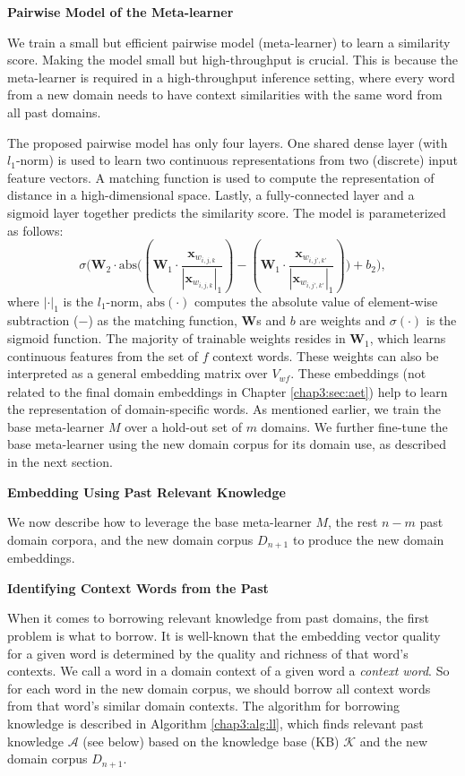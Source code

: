 \textbf{Pairwise Model of the Meta-learner}

We train a small but efficient pairwise model (meta-learner) to learn a similarity score. 
Making the model small but high-throughput is crucial.
This is because the meta-learner is required in a high-throughput inference setting, where every word from a new domain needs to have context similarities with the same word from all past domains. 

The proposed pairwise model has only four layers. 
One shared dense layer (with $l_1$-norm) is used to learn two continuous representations from two (discrete) input feature vectors.
A matching function is used to compute the representation of distance in a high-dimensional space.
Lastly, a fully-connected layer and a sigmoid layer together predicts the similarity score.
The model is parameterized as follows:
\begin{equation}
\sigma \big( \bm{W}_2 \cdot \text{abs}\big( ( \bm{W}_1 \cdot \frac{\mathbf{x}_{w_{i, j, k}}}{ |\mathbf{x}_{w_{i, j, k}}|_1 }) - (\bm{W}_1 \cdot \frac{\mathbf{x}_{w_{i, j', k'}} }{ |\mathbf{x}_{w_{i, j', k'}}|_1 } ) \big) + b_2 \big) ,
\end{equation}
where $|\cdot|_1$ is the $l_1$-norm, $\text{abs}(\cdot)$ computes the absolute value of element-wise subtraction ($-$) as the matching function, $\bm{W}$s and $b$ are weights and $\sigma (\cdot)$ is the sigmoid function.
The majority of trainable weights resides in $\bm{W}_1$, which learns continuous features from the set of $f$ context words.
These weights can also be interpreted as a general embedding matrix over $V_{\textit{wf}}$. 
These embeddings (not related to the final domain embeddings in Chapter \ref{chap3:sec:aet}) help to learn the representation of domain-specific words.
As mentioned earlier, we train the base meta-learner $M$ over a hold-out set of $m$ domains.
We further fine-tune the base meta-learner using the new domain corpus for its domain use, as described in the next section.

\textbf{Embedding Using Past Relevant Knowledge}

We now describe how to leverage the base meta-learner $M$, the rest $n-m$ past domain corpora, and the new domain corpus $D_{n+1}$ to produce the new domain embeddings.

\textbf{Identifying Context Words from the Past}

When it comes to borrowing relevant knowledge from past domains, the first problem is what to borrow.
It is well-known that the embedding vector quality for a given word is determined by the quality and richness of that word's contexts.
We call a word in a domain context of a given word a \emph{context word}.
So for each word in the new domain corpus, we should borrow all context words from that word's similar domain contexts.
The algorithm for borrowing knowledge is described in Algorithm \ref{chap3:alg:ll}, which finds relevant past knowledge $\mathcal{A}$ (see below) based on the
knowledge base (KB) $\mathcal{K}$ and the new domain corpus $D_{n+1}$.

